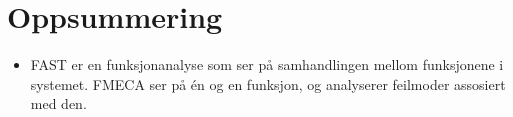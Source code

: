 \section{Oppsummering}
\label{sec:oppsum}

\begin{itemize}
    \item FAST er en funksjonanalyse som ser på samhandlingen mellom funksjonene i systemet. FMECA ser på én og en funksjon, og analyserer feilmoder assosiert med den.
\end{itemize}

